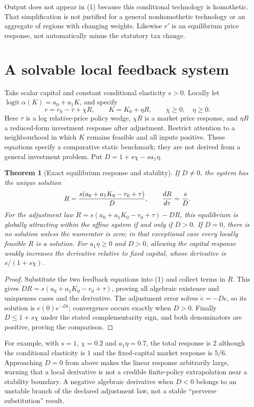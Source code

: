 \documentclass[11pt]{article}
\newtheorem{theorem}{Theorem}
\theoremstyle{definition}
\begin{document}
Output does not appear in (1) because this conditional technology is
homothetic. That simplification is not justified for a general nonhomothetic
technology or an aggregate of regions with changing weights. Likewise $r'$
is an equilibrium price response, not automatically minus the statutory
tax change.

\section*{A solvable local feedback system}
Take scalar capital and constant conditional elasticity $s>0$. Locally let
$\operatorname{logit}\alpha(K)=a_0+a_1K$, and specify
\[
 r=r_0-\tau+\chi R,\qquad K=K_0+\eta R,
 \qquad\chi\ge0,\quad\eta\ge0.
\]
Here $\tau$ is a log relative-price policy wedge, $\chi R$ is a market
price response, and $\eta R$ a reduced-form investment response after
adjustment. Restrict attention to a neighbourhood in which $K$ remains
feasible and all inputs positive. These equations specify a comparative
static benchmark; they are not derived from a general investment problem.
Put $D=1+s\chi-s a_1\eta$.
\begin{theorem}[Exact equilibrium response and stability]
If $D\ne0$, the system has the unique solution
\[
 R={s(a_0+a_1K_0-r_0+\tau)\over D},\qquad {dR\over d\tau}={s\over D}.
\]
For the adjustment law
$\dot R=s(a_0+a_1K_0-r_0+\tau)-DR$, this equilibrium is globally
attracting within the affine system if and only if $D>0$.
If $D=0$, there is no solution unless the numerator is zero; in that
exceptional case every locally feasible $R$ is a solution.
For $a_1\eta\ge0$ and $D>0$, allowing the capital response weakly increases
the derivative relative to fixed capital, whose derivative is
$s/(1+s\chi)$.
\end{theorem}
\begin{proof}
Substitute the two feedback equations into (1) and collect terms in $R$.
This gives $DR=s(a_0+a_1K_0-r_0+\tau)$, proving all algebraic existence
and uniqueness cases and the derivative. The adjustment error solves
$\dot e=-De$, so its solution is $e(0)e^{-Dt}$; convergence occurs exactly
when $D>0$. Finally $D\le1+s\chi$ under the stated complementarity sign,
and both denominators are positive, proving the comparison.
\end{proof}

For example, with $s=1$, $\chi=0.2$ and $a_1\eta=0.7$, the total response
is $2$ although the conditional elasticity is $1$ and the fixed-capital
market response is $5/6$. Approaching $D=0$ from above makes the linear
response arbitrarily large, warning that a local derivative is not a
credible finite-policy extrapolation near a stability boundary.
A negative algebraic derivative when $D<0$ belongs to an unstable branch
of the declared adjustment law, not a stable ``perverse substitution'' result.
\end{document}
